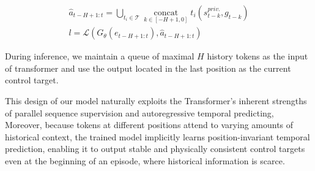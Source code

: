 \begin{equation}
\label{eq:loss}
\begin{aligned}
    \hat{a}_{t-H+1:t} = \bigcup_{t_i\in\mathcal{T}} \operatorname*{concat}_{k\in[-H+1, 0]} t_i(s_{t-k}^{priv.}, g_{t-k})\\
    l = \mathcal{L}(G_\theta(e_{t-H+1:t}), \hat{a}_{t-H+1:t})
\end{aligned}
\end{equation}

During inference, we maintain a queue of maximal $H$ history tokens as the input of transformer and use the output located in the last position as the current control target. 

This design of our \methodname model naturally exploits the Transformer’s inherent strengths of parallel sequence supervision and autoregressive temporal predicting,  Moreover, because tokens at different positions attend to varying amounts of historical context, the trained model implicitly learns position-invariant temporal prediction, enabling it to output stable and physically consistent control targets even at the beginning of an episode, where historical information is scarce.
